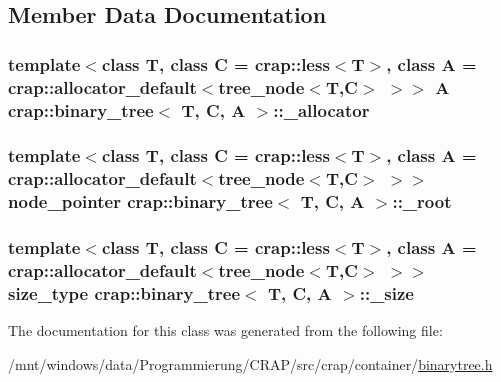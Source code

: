 \subsection{Member Data Documentation}
\hypertarget{classcrap_1_1binary__tree_a016966b0182a79e6de3852a3c1eb9b76}{
\subsubsection[{\-\_\-allocator}]{\setlength{\rightskip}{0pt plus 5cm}template$<$class T, class C = crap\-::less$<$\-T$>$, class A = crap\-::allocator\-\_\-default$<$tree\-\_\-node$<$\-T,\-C$>$ $>$$>$ A {\bf crap\-::binary\-\_\-tree}$<$ T, C, A $>$\-::\-\_\-allocator\hspace{0.3cm}{\ttfamily [protected]}}}\label{classcrap_1_1binary__tree_a016966b0182a79e6de3852a3c1eb9b76}
\hypertarget{classcrap_1_1binary__tree_a72a63753bc21bd96aa06897685c8fc1f}{
\subsubsection[{\-\_\-root}]{\setlength{\rightskip}{0pt plus 5cm}template$<$class T, class C = crap\-::less$<$\-T$>$, class A = crap\-::allocator\-\_\-default$<$tree\-\_\-node$<$\-T,\-C$>$ $>$$>$ {\bf node\-\_\-pointer} {\bf crap\-::binary\-\_\-tree}$<$ T, C, A $>$\-::\-\_\-root\hspace{0.3cm}{\ttfamily [protected]}}}\label{classcrap_1_1binary__tree_a72a63753bc21bd96aa06897685c8fc1f}
\hypertarget{classcrap_1_1binary__tree_a9a8c2867f018e1b57a173a3c8e411181}{
\subsubsection[{\-\_\-size}]{\setlength{\rightskip}{0pt plus 5cm}template$<$class T, class C = crap\-::less$<$\-T$>$, class A = crap\-::allocator\-\_\-default$<$tree\-\_\-node$<$\-T,\-C$>$ $>$$>$ {\bf size\-\_\-type} {\bf crap\-::binary\-\_\-tree}$<$ T, C, A $>$\-::\-\_\-size\hspace{0.3cm}{\ttfamily [protected]}}}\label{classcrap_1_1binary__tree_a9a8c2867f018e1b57a173a3c8e411181}


The documentation for this class was generated from the following file\-:\begin{DoxyCompactItemize}
\item 
/mnt/windows/data/\-Programmierung/\-C\-R\-A\-P/src/crap/container/\hyperlink{binarytree_8h}{binarytree.\-h}\end{DoxyCompactItemize}

